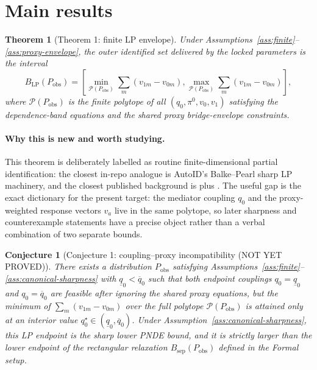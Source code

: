 \documentclass[11pt]{article}
\theoremstyle{definition}
\theoremstyle{plain}
\newtheorem{theorem}{Theorem}
\newtheorem{conjecture}{Conjecture}
\theoremstyle{remark}
\begin{document}
\section{Main results}
\begin{theorem}[Theorem 1: finite LP envelope]\label{thm:lp-envelope}
Under Assumptions~\ref{ass:finite}--\ref{ass:proxy-envelope}, the outer
identified set delivered by the locked parameters is the interval
\[
  B_{\mathrm{LP}}(P_{\mathrm{obs}})
  =\left[
     \min_{\mathcal P(P_{\mathrm{obs}})} \sum_m(v_{1m}-v_{0m}),
     \max_{\mathcal P(P_{\mathrm{obs}})} \sum_m(v_{1m}-v_{0m})
   \right],
\]
where \(\mathcal P(P_{\mathrm{obs}})\) is the finite polytope of all
\((q_0,\pi^0,v_0,v_1)\) satisfying the dependence-band equations and the shared
proxy bridge-envelope constraints.
\end{theorem}

\paragraph{Why this is new and worth studying.}
This theorem is deliberately labelled as routine finite-dimensional partial
identification: the closest in-repo analogue is AutoID's Balke--Pearl sharp LP
machinery, and the closest published background is \citet{GabrielSachsSjolander2023}
plus \citet{GhassamiShpitserTchetgen2023}.  The useful gap is the exact
dictionary for the present target: the mediator coupling \(q_0\) and the
proxy-weighted response vectors \(v_a\) live in the same polytope, so later
sharpness and counterexample statements have a precise object rather than a
verbal combination of two separate bounds.

\begin{conjecture}[Conjecture 1: coupling--proxy incompatibility (NOT YET PROVED)]\label{conj:interior-coupling}
There exists a distribution \(P_{\mathrm{obs}}\) satisfying
Assumptions~\ref{ass:finite}--\ref{ass:canonical-sharpness} with
\(\underline q_0<\overline q_0\) such that both endpoint couplings
\(q_0=\underline q_0\) and \(q_0=\overline q_0\) are feasible after ignoring
the shared proxy equations, but the minimum of
\(\sum_m(v_{1m}-v_{0m})\) over the full polytope
\(\mathcal P(P_{\mathrm{obs}})\) is attained only at an interior value
\(q_0^\star\in(\underline q_0,\overline q_0)\).  Under
Assumption~\ref{ass:canonical-sharpness}, this LP endpoint is the sharp lower
PNDE bound, and it is strictly larger than the lower endpoint of the
rectangular relaxation \(B_{\mathrm{sep}}(P_{\mathrm{obs}})\) defined in the
Formal setup.
\end{conjecture}
\end{document}
